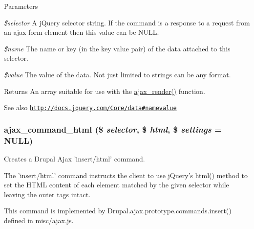 \begin{DoxyParams}{Parameters}
\item[{\em \$selector}]A jQuery selector string. If the command is a response to a request from an ajax form element then this value can be NULL. \item[{\em \$name}]The name or key (in the key value pair) of the data attached to this selector. \item[{\em \$value}]The value of the data. Not just limited to strings can be any format.\end{DoxyParams}
\begin{DoxyReturn}{Returns}
An array suitable for use with the \hyperlink{group__ajax_ga241c2426bdde049c55b05b7bf5d714a2}{ajax\_\-render()} function.
\end{DoxyReturn}
\begin{DoxySeeAlso}{See also}
\href{http://docs.jquery.com/Core/data#namevalue}{\tt http://docs.jquery.com/Core/data\#namevalue} 
\end{DoxySeeAlso}
\hypertarget{group__ajax__commands_ga37b14987e96029b64247d750a5d4ed79}{
\subsubsection[{ajax\_\-command\_\-html}]{\setlength{\rightskip}{0pt plus 5cm}ajax\_\-command\_\-html (\$ {\em selector}, \/  \$ {\em html}, \/  \$ {\em settings} = {\ttfamily NULL})}}
\label{group__ajax__commands_ga37b14987e96029b64247d750a5d4ed79}
Creates a Drupal Ajax 'insert/html' command.

The 'insert/html' command instructs the client to use jQuery's html() method to set the HTML content of each element matched by the given selector while leaving the outer tags intact.

This command is implemented by Drupal.ajax.prototype.commands.insert() defined in misc/ajax.js.


